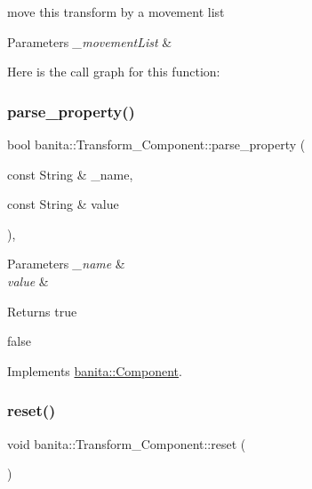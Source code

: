 move this transform by a movement list 


\begin{DoxyParams}{Parameters}
{\em \+\_\+movement\+List} & \\
\hline
\end{DoxyParams}
Here is the call graph for this function\+:
\mbox{\label{classbanita_1_1_transform___component_a0f3ace424235b3992e01dbddfe85f088}} 
\subsubsection{\texorpdfstring{parse\_property()}{parse\_property()}}
{\footnotesize\ttfamily bool banita\+::\+Transform\+\_\+\+Component\+::parse\+\_\+property (\begin{DoxyParamCaption}\item[{const String \&}]{\+\_\+name,  }\item[{const String \&}]{value }\end{DoxyParamCaption})\hspace{0.3cm}{\ttfamily [override]}, {\ttfamily [virtual]}}


\begin{DoxyParams}{Parameters}
{\em \+\_\+name} & \\
\hline
{\em value} & \\
\hline
\end{DoxyParams}
\begin{DoxyReturn}{Returns}
true 

false 
\end{DoxyReturn}


Implements \mbox{\hyperlink{classbanita_1_1_component_a619154ef2bed8e4493413bdef6117716}{banita\+::\+Component}}.

\mbox{\label{classbanita_1_1_transform___component_a53215c14bf428c45f39df2861bfeda6a}} 
\subsubsection{\texorpdfstring{reset()}{reset()}}
{\footnotesize\ttfamily void banita\+::\+Transform\+\_\+\+Component\+::reset (\begin{DoxyParamCaption}{ }\end{DoxyParamCaption})\hspace{0.3cm}{\ttfamily [inline]}}



